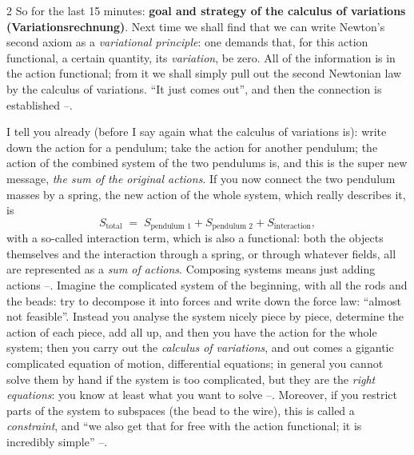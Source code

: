 \begin{paracol}{2}
So for the last 15 minutes: \textbf{goal and strategy of the calculus of variations (Variationsrechnung)}. Next time we shall find that we can write Newton's second axiom as a \emph{variational principle}: one demands that, for this action functional, a certain quantity, its \emph{variation}, be zero. All of the information is in the action functional; from it we shall simply pull out the second Newtonian law by the calculus of variations. ``It just comes out'', and then the connection is established --.

\begin{intuition}\label{int:lag-sum}
I tell you already (before I say again what the calculus of variations is): write down the action for a pendulum; take the action for another pendulum; the action of the combined system of the two pendulums is, and this is the super new message, \emph{the sum of the original actions}. If you now connect the two pendulum masses by a spring, the new action of the whole system, which really describes it, is
\[
  S_{\text{total}}\;=\;S_{\text{pendulum 1}}+S_{\text{pendulum 2}}+S_{\text{interaction}},
\]
with a so-called interaction term, which is also a functional: both the objects themselves and the interaction through a spring, or through whatever fields, all are represented as a \emph{sum of actions}. Composing systems means just adding actions --.
Imagine the complicated system of the beginning, with all the rods and the beads: try to decompose it into forces and write down the force law: ``almost not feasible''. Instead you analyse the system nicely piece by piece, determine the action of each piece, add all up, and then you have the action for the whole system; then you carry out the \emph{calculus of variations}, and out comes a gigantic complicated equation of motion, differential equations; in general you cannot solve them by hand if the system is too complicated, but they are the \emph{right equations}: you know at least what you want to solve --.
Moreover, if you restrict parts of the system to subspaces (the bead to the wire), this is called a \emph{constraint}, and ``we also get that for free with the action functional; it is incredibly simple'' --.
\end{intuition}


\end{paracol}
